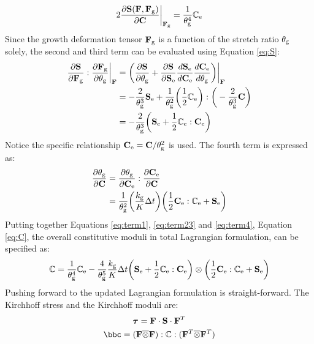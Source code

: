 \begin{equation} \label{eq:term1}
2\frac{\partial\bold{S}(\bold{F}, \bold{F}_{\mathrm{g}})}{\partial\bold{C}}\bigg|_{\bold{F}_{\mathrm{g}}} = \frac{1}{\theta_{\mathrm{g}}^4}\mathbb{C}_{\mathrm{e}}
\end{equation}
Since the growth deformation tensor $\bold{F}_{\mathrm{g}}$ is a function of the stretch ratio $\theta_{\mathrm{g}}$ solely, the second and third term can be evaluated using Equation \ref{eq:S}:
\begin{equation} \label{eq:term23}
\begin{split}
\frac{\partial\bold{S}}{\partial\bold{F}_{\mathrm{g}}} : \frac{\partial\bold{F}_{\mathrm{g}}}{\partial\theta_{\mathrm{g}}}\bigg|_{\bold{F}} &= \bigg( \frac{\partial\bold{S}}{\partial\theta_{\mathrm{g}}} +  \frac{\partial\bold{S}}{\partial\bold{S}_{\mathrm{e}}} \frac{d\bold{S}_{\mathrm{e}}}{d\bold{C}_{\mathrm{e}}} \frac{d\bold{C}_{\mathrm{e}}}{d\theta_{\mathrm{g}}} \bigg) \bigg|_{\bold{F}} \\ 
	&= -\frac{2}{\theta_{\mathrm{g}}^3}\bold{S}_{\mathrm{e}} + \frac{1}{\theta_{\mathrm{g}}^2} \bigg(\frac{1}{2}\mathbb{C}_{\mathrm{e}}\bigg) : \bigg( -\frac{2}{\theta_{\mathrm{g}}^3}\bold{C} \bigg) \\
	&= -\frac{2}{\theta_{\mathrm{g}}^3}\bigg( \bold{S}_{\mathrm{e}} + \frac{1}{2}\mathbb{C}_{\mathrm{e}} : \bold{C}_{\mathrm{e}} \bigg)
\end{split}  
\end{equation}
Notice the specific relationship $\bold{C}_{\mathrm{e}} = \bold{C}/\theta_{\mathrm{g}}^2$ is used. The fourth term is expressed as:
\begin{equation} \label{eq:term4}
\begin{split}
\frac{\partial\theta_{\mathrm{g}}}{\partial\bold{C}} &= \frac{\partial\theta_{\mathrm{g}}}{\partial\bold{C}_{\mathrm{e}}} : \frac{\partial\bold{C}_{\mathrm{e}}}{\partial\bold{C}} \\
	&= \frac{1}{\theta_{\mathrm{g}}^2} \bigg( \frac{k_{\mathrm{g}}}{K}\Delta t\bigg)\bigg(\frac{1}{2}\bold{C}_{\mathrm{e}} : \mathbb{C}_{\mathrm{e}} + \bold{S}_{\mathrm{e}} \bigg)
\end{split}
\end{equation}
Putting together Equations \ref{eq:term1}, \ref{eq:term23} and \ref{eq:term4}, Equation \ref{eq:C}, the overall constitutive moduli in total Lagrangian formulation, can be specified as:
\begin{equation} \label{eq:C2}
\mathbb{C} = \frac{1}{\theta_{\mathrm{g}}^4}\mathbb{C}_{\mathrm{e}} - \frac{4}{\theta_{\mathrm{g}}^5}\frac{k_{\mathrm{g}}}{K}\Delta t\bigg(\bold{S}_{\mathrm{e}} + \frac{1}{2}\mathbb{C}_{\mathrm{e}} : \bold{C}_{\mathrm{e}} \bigg) \otimes \bigg( \frac{1}{2} \bold{C}_{\mathrm{e}} : \mathbb{C}_{\mathrm{e}} + \bold{S}_{\mathrm{e}} \bigg)
\end{equation}
Pushing forward to the updated Lagrangian formulation is straight-forward. The Kirchhoff stress and the Kirchhoff moduli are:
\begin{equation} \label{eq:tau}
\boldsymbol{\tau} = \bold{F} \cdot \bold{S} \cdot \bold{F}^T
\end{equation}
\begin{equation} \label{eq:moduli}
\bbc = (\bF \overline\otimes \bF) : \bbC : (\bF^T \overline\otimes \bF^T)
\end{equation}






